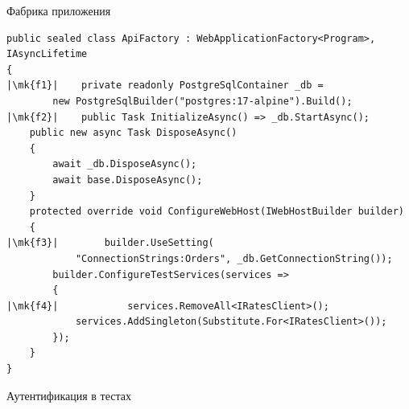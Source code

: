 \documentclass[aspectratio=169,10pt,t]{beamer}
\newcommand{\mk}[1]{\tikz[remember picture,overlay]\coordinate (#1) at (0,0.55ex);}
\begin{document}
\begin{frame}[fragile]{Фабрика приложения}
\begin{lstlisting}[style=csharp,basicstyle=\ttfamily\fontsize{6.8}{7.6}\selectfont,escapechar=|]
public sealed class ApiFactory : WebApplicationFactory<Program>, IAsyncLifetime
{
|\mk{f1}|    private readonly PostgreSqlContainer _db =
        new PostgreSqlBuilder("postgres:17-alpine").Build();
|\mk{f2}|    public Task InitializeAsync() => _db.StartAsync();
    public new async Task DisposeAsync()
    {
        await _db.DisposeAsync();
        await base.DisposeAsync();
    }
    protected override void ConfigureWebHost(IWebHostBuilder builder)
    {
|\mk{f3}|        builder.UseSetting(
            "ConnectionStrings:Orders", _db.GetConnectionString());
        builder.ConfigureTestServices(services =>
        {
|\mk{f4}|            services.RemoveAll<IRatesClient>();
            services.AddSingleton(Substitute.For<IRatesClient>());
        });
    }
}
\end{lstlisting}
\end{frame}

\begin{frame}{Аутентификация в тестах}
  \slidetop


  \slidegap
\end{frame}
\end{document}
